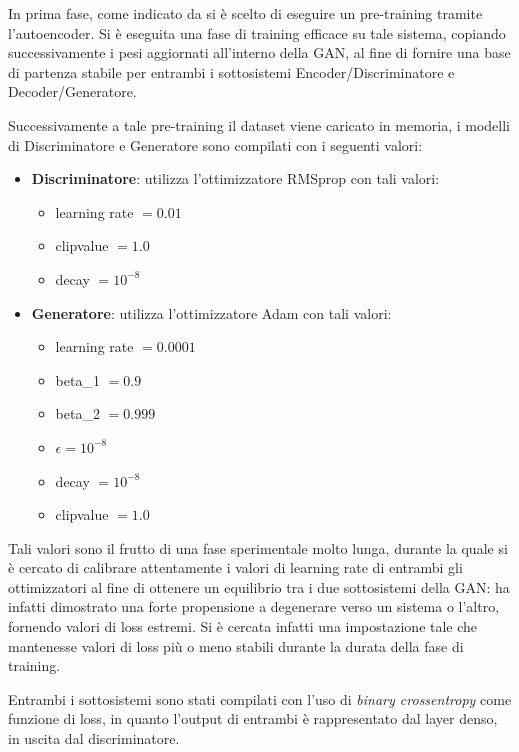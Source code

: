 In prima fase, come indicato da \cite{deepdga} si è scelto di eseguire un pre-training tramite l'autoencoder. Si è eseguita una fase di training efficace su tale sistema, copiando successivamente i pesi aggiornati all'interno della GAN, al fine di fornire una base di partenza stabile per entrambi i sottosistemi Encoder/Discriminatore e Decoder/Generatore.

Successivamente a tale pre-training il dataset viene caricato in memoria, i modelli di Discriminatore e Generatore sono compilati con i seguenti valori: 
\begin{itemize}
	\item \textbf{Discriminatore}: utilizza l'ottimizzatore RMSprop \cite{rmsprop} con tali valori: 
		\begin{itemize}
			\item learning rate $= 0.01$ 
			\item clipvalue $= 1.0$
			\item decay $= 10^{-8}$
		\end{itemize}
	\item \textbf{Generatore}: utilizza l'ottimizzatore Adam con tali valori:
	\begin{itemize}
		\item learning rate $= 0.0001$
		\item beta\_1 $= 0.9$
		\item beta\_2 $= 0.999$
		\item $\epsilon = 10^{-8}$
		\item decay $= 10^{-8}$
		\item clipvalue  $= 1.0$
	\end{itemize}
\end{itemize}

Tali valori sono il frutto di una fase sperimentale molto lunga, durante la quale si è cercato di calibrare attentamente i valori di learning rate di entrambi gli ottimizzatori al fine di ottenere un equilibrio tra i due sottosistemi della GAN: ha infatti dimostrato una forte propensione a degenerare verso un sistema o l'altro, fornendo valori di loss estremi. Si è cercata infatti una impostazione tale che mantenesse valori di loss più o meno stabili durante la durata della fase di training.

Entrambi i sottosistemi sono stati compilati con l'uso di \textit{binary crossentropy} come funzione di loss, in quanto l'output di entrambi è rappresentato dal layer denso, in uscita dal discriminatore.

